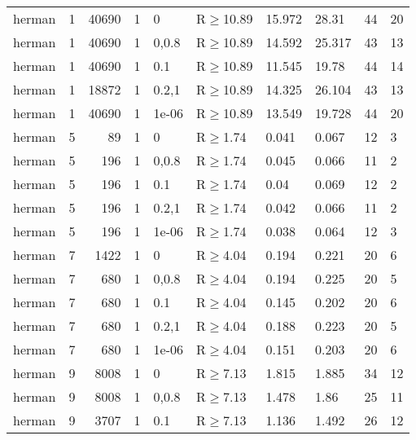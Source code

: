 \begin{longtable}{llrrllllll}
 herman        & 1         &  	40690 &    1 & 0     & R$\geq$10.89 & 15.972  & 28.31   & 44      & 20   \\
 herman        & 1         &  	40690 &    1 & 0,0.8 & R$\geq$10.89 & 14.592  & 25.317  & 43      & 13   \\
 herman        & 1         &  	40690 &    1 & 0.1   & R$\geq$10.89 & 11.545  & 19.78   & 44      & 14   \\
 herman        & 1         &  	18872 &    1 & 0.2,1 & R$\geq$10.89 & 14.325  & 26.104  & 43      & 13   \\
 herman        & 1         &  	40690 &    1 & 1e-06 & R$\geq$10.89 & 13.549  & 19.728  & 44      & 20   \\
 herman        & 5         &     	89 &    1 & 0     & R$\geq$1.74  & 0.041   & 0.067   & 12      & 3    \\
 herman        & 5         &    	196 &    1 & 0,0.8 & R$\geq$1.74  & 0.045   & 0.066   & 11      & 2    \\
 herman        & 5         &    	196 &    1 & 0.1   & R$\geq$1.74  & 0.04    & 0.069   & 12      & 2    \\
 herman        & 5         &    	196 &    1 & 0.2,1 & R$\geq$1.74  & 0.042   & 0.066   & 11      & 2    \\
 herman        & 5         &    	196 &    1 & 1e-06 & R$\geq$1.74  & 0.038   & 0.064   & 12      & 3    \\
 herman        & 7         &   	1422 &    1 & 0     & R$\geq$4.04  & 0.194   & 0.221   & 20      & 6    \\
 herman        & 7         &    	680 &    1 & 0,0.8 & R$\geq$4.04  & 0.194   & 0.225   & 20      & 5    \\
 herman        & 7         &    	680 &    1 & 0.1   & R$\geq$4.04  & 0.145   & 0.202   & 20      & 6    \\
 herman        & 7         &    	680 &    1 & 0.2,1 & R$\geq$4.04  & 0.188   & 0.223   & 20      & 5    \\
 herman        & 7         &    	680 &    1 & 1e-06 & R$\geq$4.04  & 0.151   & 0.203   & 20      & 6    \\
 herman        & 9         &   	8008 &    1 & 0     & R$\geq$7.13  & 1.815   & 1.885   & 34      & 12   \\
 herman        & 9         &   	8008 &    1 & 0,0.8 & R$\geq$7.13  & 1.478   & 1.86    & 25      & 11   \\
 herman        & 9         &   	3707 &    1 & 0.1   & R$\geq$7.13  & 1.136   & 1.492   & 26      & 12   \\

\end{longtable}
